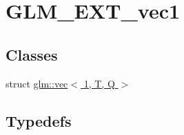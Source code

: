 \hypertarget{group__ext__vec1}{}\section{G\+L\+M\+\_\+\+E\+X\+T\+\_\+vec1}
\label{group__ext__vec1}
\subsection*{Classes}
\begin{DoxyCompactItemize}
\item 
struct \hyperlink{structglm_1_1vec_3_011_00_01_t_00_01_q_01_4}{glm\+::vec$<$ 1, T, Q $>$}
\end{DoxyCompactItemize}
\subsection*{Typedefs}
